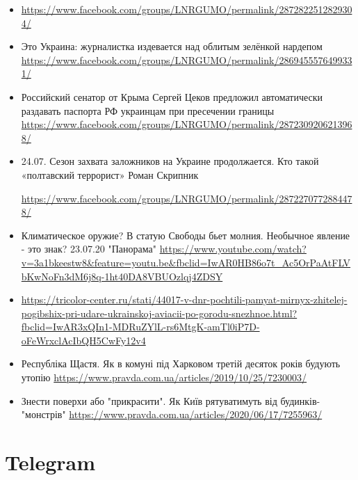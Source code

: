 \documentclass[a4paper,11pt]{book}
\begin{document}
\begin{itemize}
		\item 
			\url{https://www.facebook.com/groups/LNRGUMO/permalink/2872822512829304/}

		\item Это Украина: журналистка издевается над облитым зелёнкой нардепом
						\url{https://www.facebook.com/groups/LNRGUMO/permalink/2869455576499331/}

		\item Российский сенатор от Крыма Сергей Цеков предложил автоматически
						раздавать паспорта РФ украинцам при пресечении границы
								\url{https://www.facebook.com/groups/LNRGUMO/permalink/2872309206213968/}

		\item 24.07. Сезон захвата заложников на Украине продолжается. Кто такой
						«полтавский террорист» Роман Скрипник

						\url{https://www.facebook.com/groups/LNRGUMO/permalink/2872270772884478/}

		\item Климатическое оружие? В статую Свободы бьет молния. Необычное явление
						- это знак? 23.07.20 "Панорама"
						\url{https://www.youtube.com/watch?v=3a1bkeestw8&feature=youtu.be&fbclid=IwAR0HB86o7t_Ac5OrPaAtFLVbKwNoFn3dM6j8q-1ht40DA8VBUOzlqj4ZDSY}
		\item \url{https://tricolor-center.ru/stati/44017-v-dnr-pochtili-pamyat-mirnyx-zhitelej-pogibshix-pri-udare-ukrainskoj-aviacii-po-gorodu-snezhnoe.html?fbclid=IwAR3xQIn1-MDRuZYlL-rs6MtgK-amTl0iP7D-oFeWrxclAcIbQH5CwFy12v4}

		\item Республіка Щастя. Як в комуні під Харковом третій десяток років будують утопію
						\url{https://www.pravda.com.ua/articles/2019/10/25/7230003/}

		\item Знести поверхи або "прикрасити". Як Київ рятуватимуть від будинків-"монстрів"
						\url{https://www.pravda.com.ua/articles/2020/06/17/7255963/}
\end{itemize}


 
 
\chapter{Telegram}
\end{document}
